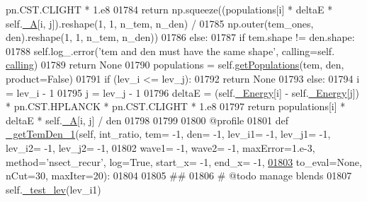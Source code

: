 \begin{DoxyCode}
{{      pn.CST.CLIGHT * 1.e8 
01784                     \textcolor{keywordflow}{return} np.squeeze((populations[i] * deltaE * self.\hyperlink{classpyneb_1_1core_1_1pynebcore_1_1_atom_aa6416fe661b8deaa008179314727e025}{\_A}[i, j]).reshape(1, 1, n\_tem, 
      n\_den) / 
01785                                       np.outer(tem\_ones, den).reshape(1, 1, n\_tem, n\_den))
01786         \textcolor{keywordflow}{else}:
01787             \textcolor{keywordflow}{if} tem.shape != den.shape:
01788                 self.log\_.error(\textcolor{stringliteral}{'tem and den must have the same shape'}, calling=self.
      \hyperlink{classpyneb_1_1core_1_1pynebcore_1_1_atom_a373b7735acf4f528b54bddf373ad67a1}{calling})
01789                 \textcolor{keywordflow}{return} \textcolor{keywordtype}{None}
01790             populations = self.\hyperlink{classpyneb_1_1core_1_1pynebcore_1_1_atom_aab7496403c8aaef40ab3b20b5c00e9f0}{getPopulations}(tem, den, product=\textcolor{keyword}{False})
01791             \textcolor{keywordflow}{if} (lev\_i <= lev\_j):
01792                 \textcolor{keywordflow}{return} \textcolor{keywordtype}{None}
01793             \textcolor{keywordflow}{else}:
01794                 i = lev\_i - 1
01795                 j = lev\_j - 1
01796                 deltaE = (self.\hyperlink{classpyneb_1_1core_1_1pynebcore_1_1_atom_a52e68715246d258bf0a14f4bd06e89e4}{\_Energy}[i] - self.\hyperlink{classpyneb_1_1core_1_1pynebcore_1_1_atom_a52e68715246d258bf0a14f4bd06e89e4}{\_Energy}[j]) * pn.CST.HPLANCK * pn.CST.CLIGHT
       * 1.e8 
01797                 \textcolor{keywordflow}{return} populations[i] * deltaE * self.\hyperlink{classpyneb_1_1core_1_1pynebcore_1_1_atom_aa6416fe661b8deaa008179314727e025}{\_A}[i, j] / den
01798 
01799         
01800     @profile
01801     \textcolor{keyword}{def }\hyperlink{classpyneb_1_1core_1_1pynebcore_1_1_atom_ad1d75f64b27a6acee079b5738b69dabe}{\_getTemDen\_1}(self, int\_ratio, tem= -1, den= -1, lev\_i1= -1, lev\_j1= -1, lev\_i2= -1, 
      lev\_j2= -1,
01802                   wave1= -1, wave2= -1, maxError=1.e-3, method=\textcolor{stringliteral}{'nsect\_recur'}, log=\textcolor{keyword}{True}, start\_x= -1, end\_x=
       -1,
\hypertarget{pynebcore_8py_source_l01803}{}\hyperlink{classpyneb_1_1core_1_1pynebcore_1_1_atom_ad1d75f64b27a6acee079b5738b69dabe}{01803}                   to\_eval=\textcolor{keywordtype}{None}, nCut=30, maxIter=20):
01804 
01805         \textcolor{comment}{##}
01806         \textcolor{comment}{# @todo manage blends}
01807         self.\hyperlink{classpyneb_1_1core_1_1pynebcore_1_1_atom_ade3de73e8bdb814d01d2d9af98eba87f}{\_test\_lev}(lev\_i1)
}}
\end{DoxyCode}
